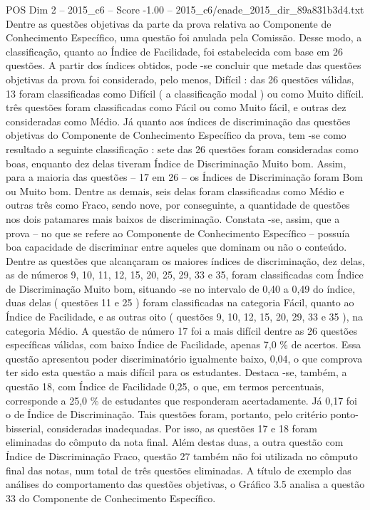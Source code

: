 \begin{textsample}{POS Dim 2 – 2015\_c6 – Score -1.00 – 2015\_c6/enade\_2015\_dir\_89a831b3d4.txt}
Dentre as questões objetivas da parte da prova relativa ao Componente de Conhecimento Específico, uma questão foi anulada pela Comissão.
Desse modo, a classificação, quanto ao Índice de Facilidade, foi estabelecida com base em 26 questões.
A partir dos índices obtidos, pode -se concluir que metade das questões objetivas da prova foi considerado, pelo menos, Difícil : das 26 questões válidas, 13 foram classificadas como Difícil ( a classificação modal ) ou como Muito difícil. três questões foram classificadas como Fácil ou como Muito fácil, e outras dez consideradas como Médio.
Já quanto aos índices de discriminação das questões objetivas do Componente de Conhecimento Específico da prova, tem -se como resultado a seguinte classificação : sete das 26 questões foram consideradas como boas, enquanto dez delas tiveram Índice de Discriminação Muito bom.
Assim, para a maioria das questões – 17 em 26 – os Índices de Discriminação foram Bom ou Muito bom.
Dentre as demais, seis delas foram classificadas como Médio e outras três como Fraco, sendo nove, por conseguinte, a quantidade de questões nos dois patamares mais baixos de discriminação.
Constata -se, assim, que a prova – no que se refere ao Componente de Conhecimento Específico – possuía boa capacidade de discriminar entre aqueles que dominam ou não o conteúdo.
Dentre as questões que alcançaram os maiores índices de discriminação, dez delas, as de números 9, 10, 11, 12, 15, 20, 25, 29, 33 e 35, foram classificadas com Índice de Discriminação Muito bom, situando -se no intervalo de 0,40 a 0,49 do índice, duas delas ( questões 11 e 25 ) foram classificadas na categoria Fácil, quanto ao Índice de Facilidade, e as outras oito ( questões 9, 10, 12, 15, 20, 29, 33 e 35 ), na categoria Médio.
A questão de número 17 foi a mais difícil dentre as 26 questões específicas válidas, com baixo Índice de Facilidade, apenas 7,0 \% de acertos.
Essa questão apresentou poder discriminatório igualmente baixo, 0,04, o que comprova ter sido esta questão a mais difícil para os estudantes.
Destaca -se, também, a questão 18, com Índice de Facilidade 0,25, o que, em termos percentuais, corresponde a 25,0 \% de estudantes que responderam acertadamente.
Já 0,17 foi o de Índice de Discriminação.
Tais questões foram, portanto, pelo critério ponto-bisserial, consideradas inadequadas.
Por isso, as questões 17 e 18 foram eliminadas do cômputo da nota final.
Além destas duas, a outra questão com Índice de Discriminação Fraco, questão 27 também não foi utilizada no cômputo final das notas, num total de três questões eliminadas.
A título de exemplo das análises do comportamento das questões objetivas, o Gráfico 3.5 analisa a questão 33 do Componente de Conhecimento Específico.

\end{textsample}

